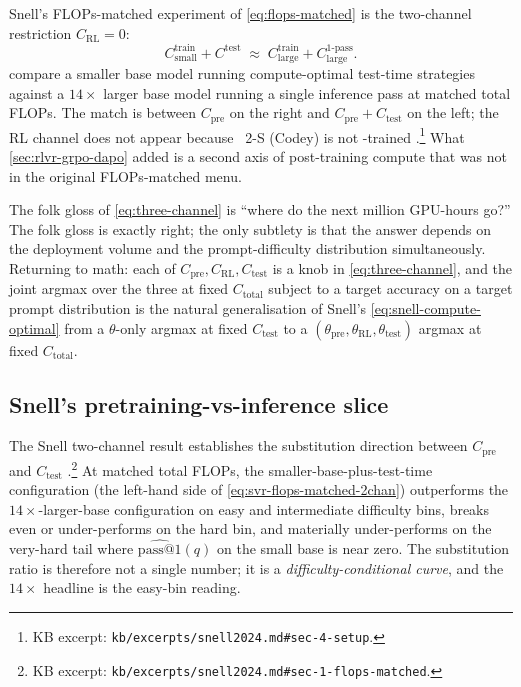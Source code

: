 Snell's FLOPs-matched experiment of \cref{eq:flops-matched} is the
two-channel restriction $C_\text{RL} = 0$:
\begin{equation}
  C_\text{small}^\text{train} + C^\text{test}
    \;\approx\; C_\text{large}^\text{train} + C_\text{large}^\text{1-pass}.
  \label{eq:svr-flops-matched-2chan}
\end{equation}
\citet[\S 6]{snell2024} compare a smaller base model running
compute-optimal test-time strategies against a $14\times$ larger base
model running a single inference pass at matched total FLOPs. The
match is between $C_\text{pre}$ on the right and
$C_\text{pre} + C_\text{test}$ on the left; the RL channel does not
appear because ~2-S\* (Codey) is not -trained
\citep[\S 4]{snell2024}.\footnote{KB excerpt:
\texttt{kb/excerpts/snell2024.md\#sec-4-setup}.} What
\cref{sec:rlvr-grpo-dapo} added is a second axis of post-training
compute that was not in the original FLOPs-matched menu.

\begin{intuition}
The folk gloss of \cref{eq:three-channel} is ``where do the next
million GPU-hours go?'' The folk gloss is exactly right; the only
subtlety is that the answer depends on the deployment volume and the
prompt-difficulty distribution simultaneously. Returning to math: each
of $C_\text{pre}, C_\text{RL}, C_\text{test}$ is a knob in
\cref{eq:three-channel}, and the joint argmax over the three at fixed
$C_\text{total}$ subject to a target accuracy on a target prompt
distribution is the natural generalisation of Snell's
\cref{eq:snell-compute-optimal} from a $\theta$-only argmax at fixed
$C_\text{test}$ to a $(\theta_\text{pre}, \theta_\text{RL},
\theta_\text{test})$ argmax at fixed $C_\text{total}$.
\end{intuition}

\subsection{Snell's pretraining-vs-inference slice}
\label{sec:svr-pretraining-vs-inference}

The Snell two-channel result establishes the substitution direction
between $C_\text{pre}$ and $C_\text{test}$
\citep[\S 6]{snell2024}.\footnote{KB excerpt:
\texttt{kb/excerpts/snell2024.md\#sec-1-flops-matched}.} At matched
total FLOPs, the smaller-base-plus-test-time configuration (the
left-hand side of \cref{eq:svr-flops-matched-2chan}) outperforms the
$14\times$-larger-base configuration on easy and intermediate
difficulty bins, breaks even or under-performs on the hard bin, and
materially under-performs on the very-hard tail where
$\widehat{\mathrm{pass@}1}(q)$ on the small base is near zero. The
substitution ratio is therefore not a single number; it is a
\emph{difficulty-conditional curve}, and the $14\times$ headline is
the easy-bin reading.

